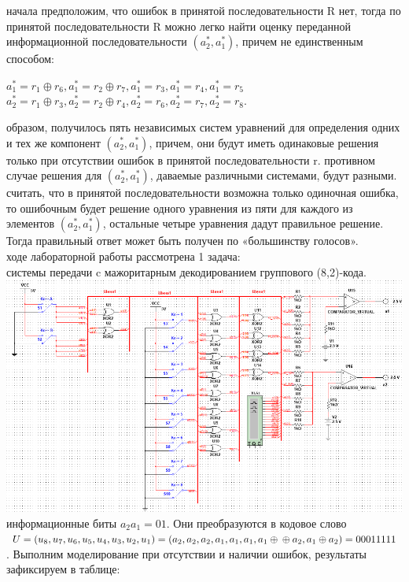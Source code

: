 \documentclass[11pt]{article}
\begin{document}
 начала предположим, что ошибок в принятой последовательности R нет, тогда по принятой последовательности R можно легко найти оценку переданной информационной последовательности $(a_{2}^{*},a_{1}^{*})$, причем не единственным способом:
\begin{center}
    $a_{1}^{*}=r_{1}\oplus r_{6},a_{1}^{*}=r_{2}\oplus r_{7}, a_{1}^{*}=r_{3}, a_{1}^{*}=r_{4}, a_{1}^{*}=r_{5}$\\
    $a_{2}^{*}=r_{1}\oplus r_{3}, a_{2}^{*}=r_{2}\oplus r_{4}, a_{2}^{*}=r_{6}, a_{2}^{*}=r_{7}, a_{2}^{*}=r_{8}.$
\end{center}
 образом, получилось пять независимых систем уравнений для определения одних и тех же компонент $(a_{2}^{*}, a_{1}^{*})$, причем, они будут иметь одинаковые решения только при отсутствии ошибок в принятой последовательности r. 
 противном случае решения для $(a_{2}^{*},a_{1}^{*})$, даваемые различными системами, будут разными. \\
 считать, что в принятой последовательности возможна только одиночная ошибка, то ошибочным будет решение одного уравнения из пяти для каждого из элементов $(a_{2}^{*},a_{1}^{*})$, остальные четыре уравнения дадут правильное решение. Тогда правильный ответ может быть получен по «большинству голосов».\\
 ходе лабораторной работы рассмотрена 1 задача:\\
 системы передачи c мажоритарным декодированием группового (8,2)-кода.\\
\includegraphics[width=1\linewidth]{scheme.png}
\newpage
{} информационные биты $a_{2} a_{1}=01$. Они преобразуются в кодовое слово $U=(u_{8},u_{7},u_{6},u_{5},u_{4},u_{3},u_{2},u_{1} )=(a_{2},a_{2},a_{2},a_{1},a_{1},a_{1},a_{1}\oplus\\ \oplus a_{2},a_{1}\oplus a_{2})=00011111$. Выполним моделирование при отсутствии и наличии ошибок, результаты зафиксируем в таблице:\\
\end{document}
